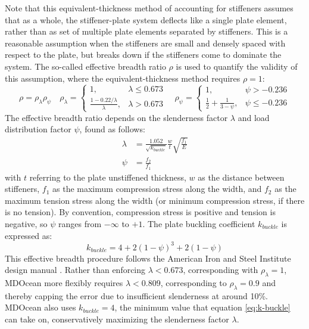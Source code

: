 Note that this equivalent-thickness method of accounting for stiffeners assumes that as a whole, the stiffener-plate system deflects like a single plate element, rather than as set of multiple plate elements separated by stiffeners.
This is a reasonable assumption when the stiffeners are small and densely spaced with respect to the plate, but breaks down if the stiffeners come to dominate the system.
The so-called effective breadth ratio $\rho$ is used to quantify the validity of this assumption, where the equivalent-thickness method requires $\rho=1$:
\begin{equation}
   \rho = \rho_\lambda \rho_\psi
\quad 
\rho_\lambda = \begin{cases}
        1, & \lambda\leq 0.673 \\
        \frac{1-0.22/\lambda}{\lambda}, & \lambda > 0.673
    \end{cases} \quad
    \rho_\psi = \begin{cases}
        1, & \psi> -0.236 \\
        \frac{1}{2}+\frac{1}{3-\psi}, & \psi \leq -0.236
    \end{cases} 
\end{equation}
The effective breadth ratio depends on the slenderness factor $\lambda$ and load distribution factor $\psi$, found as follows:
\begin{equation}
\begin{aligned}
    \lambda &= \frac{1.052}{\sqrt{k_{buckle}}} \frac{w}{t} \sqrt{\frac{f_1}{E}} \\
    \psi&=\frac{f_2}{f_1}
    \end{aligned}
\end{equation}
with $t$ referring to the plate unstiffened thickness, $w$ as the distance between stiffeners, $f_1$ as the maximum compression stress along the width, and $f_2$ as the maximum tension stress along the width (or minimum compression stress, if there is no tension).
By convention, compression stress is positive and tension is negative, so $\psi$ ranges from $-\infty$ to $+1$.
The plate buckling coefficient $k_{buckle}$ is expressed as:
\begin{equation}\label{eq:k-buckle}
  k_{buckle} = 4+2\left(1-\psi\right)^3+2\left(1-\psi\right)
\end{equation}
This effective breadth procedure follows the American Iron and Steel Institute design manual \cite{american_iron_and_steel_institute_cold-formed_1991}.
Rather than enforcing $\lambda<0.673$, corresponding with $\rho_\lambda=1$, MDOcean more flexibly requires $\lambda<0.809$, corresponding to $\rho_\lambda=0.9$ and thereby capping the error due to insufficient slenderness at around 10\%.
MDOcean also uses $k_{buckle}=4$, the minimum value that equation \eqref{eq:k-buckle} can take on, conservatively maximizing the slenderness factor $\lambda$.

